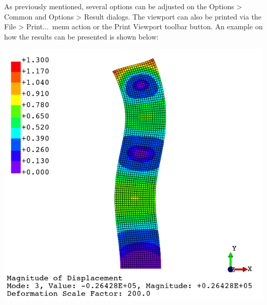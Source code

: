 \documentclass[
    11pt,        %
    a4paper,     %
    final,       %
    fleqn,       %
    notitlepage, %
    onecolumn,   %
    oneside,     %
]{article}
\begin{document}
As previously mentioned, several options can be adjusted on the Options > Common and Options > Result dialogs. The viewport can also be printed via the File > Print...\ menu action or the Print Viewport toolbar button. An example on how the results can be presented is shown below:
\begin{center}
    \includegraphics[scale=0.5]{fig/ui-4-12.png}
\end{center}
\end{document}
